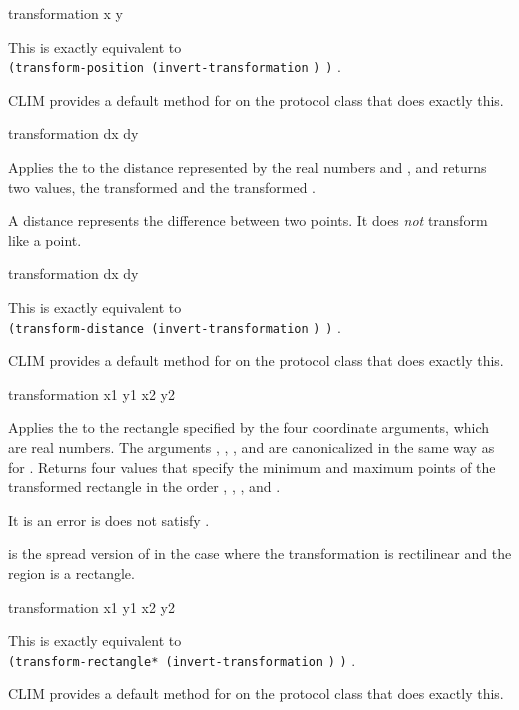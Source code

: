  {transformation x y}

This is exactly equivalent to \\
\verb+(transform-position (invert-transformation+ \verb+)+
 \verb+)+ .

CLIM provides a default method for  on the
 protocol class that does exactly this.


 {transformation dx dy}

Applies the   to the distance
represented by the real numbers  and , and returns two values,
the transformed  and the transformed .

A distance represents the difference between two points.  It does {\sl not}
transform like a point.

 {transformation dx dy} 

This is exactly equivalent to \\
\verb+(transform-distance (invert-transformation+ \verb+)+
 \verb+)+ .

CLIM provides a default method for  on the
 protocol class that does exactly this.


 {transformation x1 y1 x2 y2}

Applies the   to the rectangle
specified by the four coordinate arguments, which are real numbers.  The
arguments , , , and  are canonicalized in the
same way as for .  Returns four values that specify
the minimum and maximum points of the transformed rectangle in the order
, , , and .

It is an error is  does not satisfy
.

 is the spread version of  in the
case where the transformation is rectilinear and the region is a rectangle.

 {transformation x1 y1 x2 y2}

This is exactly equivalent to \\
\verb+(transform-rectangle* (invert-transformation+ \verb+)+
   \verb+)+ .

CLIM provides a default method for  on the
 protocol class that does exactly this.
